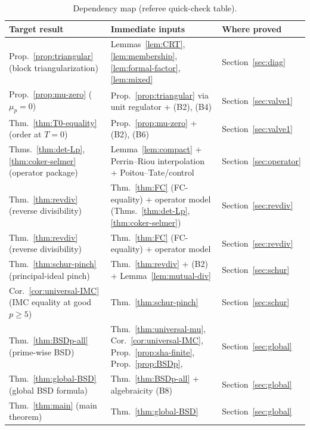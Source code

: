 \documentclass[12pt,reqno]{amsart}
\theoremstyle{definition}
\theoremstyle{remark}
\begin{document}
\begin{table}[h]
\centering
\small
\renewcommand{\arraystretch}{1.15}
\begin{tabular}{|p{}|p{}|p{}|}
\hline
\textbf{Target result} & \textbf{Immediate inputs} & \textbf{Where proved} \\
\hline
Prop.~\ref{prop:triangular} (block triangularization) &
Lemmas~\ref{lem:CRT}, \ref{lem:membership}, \ref{lem:formal-factor}, \ref{lem:mixed} &
Section~\ref{sec:diag} \\
\hline
Prop.~\ref{prop:mu-zero} ($\mu_p=0$) &
Prop.~\ref{prop:triangular} via unit regulator + (B2), (B4) &
Section~\ref{sec:valve1} \\
\hline
Thm.~\ref{thm:T0-equality} (order at $T=0$) &
Prop.~\ref{prop:mu-zero} + (B2), (B6) &
Section~\ref{sec:valve1} \\
\hline
Thms.~\ref{thm:det-Lp}, \ref{thm:coker-selmer} (operator package) &
Lemma~\ref{lem:compact} + Perrin--Riou interpolation + Poitou--Tate/control &
Section~\ref{sec:operator} \\
\hline
Thm.~\ref{thm:revdiv} (reverse divisibility) &
Thm.~\ref{thm:FC} (FC-equality) + operator model (Thms.~\ref{thm:det-Lp}, \ref{thm:coker-selmer}) &
Section~\ref{sec:revdiv} \\
\hline
Thm.~\ref{thm:revdiv} (reverse divisibility) &
Thm.~\ref{thm:FC} (FC-equality) + operator model &
Section~\ref{sec:revdiv} \\
\hline
Thm.~\ref{thm:schur-pinch} (principal-ideal pinch) &
Thm.~\ref{thm:revdiv} + (B2) + Lemma~\ref{lem:mutual-div} &
Section~\ref{sec:schur} \\
\hline
Cor.~\ref{cor:universal-IMC} (IMC equality at good $p\ge 5$) &
Thm.~\ref{thm:schur-pinch} &
Section~\ref{sec:schur} \\
\hline
Thm.~\ref{thm:BSDp-all} (prime-wise BSD) &
Thm.~\ref{thm:universal-mu}, Cor.~\ref{cor:universal-IMC}, Prop.~\ref{prop:sha-finite}, Prop.~\ref{prop:BSDp}, \cite{F7} &
Section~\ref{sec:global} \\
\hline
Thm.~\ref{thm:global-BSD} (global BSD formula) &
Thm.~\ref{thm:BSDp-all} + algebraicity (B8) &
Section~\ref{sec:global} \\
\hline
Thm.~\ref{thm:main} (main theorem) &
Thm.~\ref{thm:global-BSD} &
Section~\ref{sec:global} \\
\hline
\end{tabular}
\caption{Dependency map (referee quick-check table).}
\label{tab:depmap}
\end{table}
\end{document}
